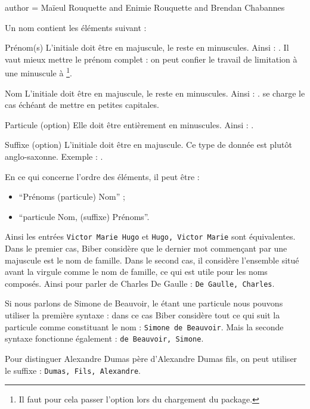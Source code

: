 \begin{latexcode}
author = {Maïeul Rouquette and Enimie Rouquette and Brendan Chabannes}
\end{latexcode}

Un nom contient les éléments suivant :
\begin{choix}
	\item[Prénom(s)]L'initiale doit être en majuscule, le reste en minuscules. Ainsi : . Il vaut mieux mettre le prénom complet : on peut confier le travail de limitation à une minuscule  à \footnote{Il faut pour cela passer l'option  lors du chargement du package.}.
	\item[Nom]L'initiale doit être en majuscule, le reste en minuscules. Ainsi : .  se charge le cas échéant de mettre en petites capitales.
	\item[Particule (option)]Elle doit être entièrement en minuscules. Ainsi : .
	\item[Suffixe (option)]L'initiale doit être en majuscule. Ce type de donnée est plutôt anglo-saxonne. Exemple : .
\end{choix}


En ce qui concerne l'ordre des éléments, il  peut être :
\begin{itemize}
\item\enquote{Prénoms  (particule)  Nom} ;
\item\enquote{particule Nom, (suffixe) Prénoms}.
\end{itemize}

Ainsi les entrées \verb|Victor Marie Hugo| et \verb|Hugo, Victor Marie| sont équivalentes.
Dans le premier cas, Biber considère que le dernier mot commençant par une majuscule est le nom de famille. Dans le second cas, il considère l'ensemble situé avant la virgule comme le nom de famille, ce qui est utile pour les noms composés. Ainsi pour parler de Charles De Gaulle : \verb|De Gaulle, Charles|.

Si nous parlons de Simone de Beauvoir, le  étant une particule nous pouvons utiliser la première syntaxe : dans ce cas Biber considère tout ce qui suit la particule comme constituant le nom : \verb|Simone de Beauvoir|.
Mais la seconde syntaxe fonctionne également : \verb|de Beauvoir, Simone|.


Pour distinguer Alexandre Dumas père d'Alexandre Dumas fils, on peut utiliser le suffixe : \verb|Dumas, Fils, Alexandre|.


